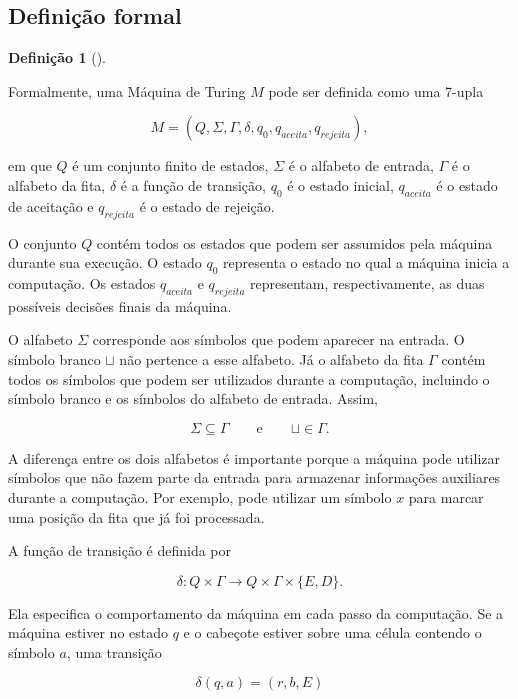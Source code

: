 \documentclass[
  brazilian,
  letterpaper,
]{book}
\theoremstyle{plain}
\theoremstyle{definition}
\newtheorem{definition}{Definição}[chapter]
\theoremstyle{remark}
\begin{document}
\subsection{Definição formal}\label{definiuxe7uxe3o-formal-1}

\begin{definition}[]\protect\hypertarget{def-mt}{}\label{def-mt}

Formalmente, uma Máquina de Turing \(M\) pode ser definida como uma
7-upla

\[
M=(Q,\Sigma,\Gamma,\delta,q_0,q_{aceita},q_{rejeita}),
\]

\end{definition}

em que \(Q\) é um conjunto finito de estados, \(\Sigma\) é o alfabeto de
entrada, \(\Gamma\) é o alfabeto da fita, \(\delta\) é a função de
transição, \(q_0\) é o estado inicial, \(q_{aceita}\) é o estado de
aceitação e \(q_{rejeita}\) é o estado de rejeição.

O conjunto \(Q\) contém todos os estados que podem ser assumidos pela
máquina durante sua execução. O estado \(q_0\) representa o estado no
qual a máquina inicia a computação. Os estados \(q_{aceita}\) e
\(q_{rejeita}\) representam, respectivamente, as duas possíveis decisões
finais da máquina.

O alfabeto \(\Sigma\) corresponde aos símbolos que podem aparecer na
entrada. O símbolo branco \(\sqcup\) não pertence a esse alfabeto. Já o
alfabeto da fita \(\Gamma\) contém todos os símbolos que podem ser
utilizados durante a computação, incluindo o símbolo branco e os
símbolos do alfabeto de entrada. Assim,

\[
\Sigma \subseteq \Gamma
\qquad\text{e}\qquad
\sqcup\in\Gamma.
\]

A diferença entre os dois alfabetos é importante porque a máquina pode
utilizar símbolos que não fazem parte da entrada para armazenar
informações auxiliares durante a computação. Por exemplo, pode utilizar
um símbolo \(x\) para marcar uma posição da fita que já foi processada.

A função de transição é definida por

\[
\delta:Q\times\Gamma
\longrightarrow
Q\times\Gamma\times\{E,D\}.
\]

Ela especifica o comportamento da máquina em cada passo da computação.
Se a máquina estiver no estado \(q\) e o cabeçote estiver sobre uma
célula contendo o símbolo \(a\), uma transição

\[
\delta(q,a)=(r,b,E)
\]
\end{document}
